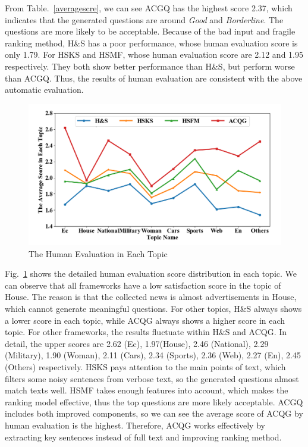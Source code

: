 \documentclass[runningheads,UTF8,article]{comsis2}
\newcommand\revised[1]{{\color{black} #1}}
\begin{document}
	\revised{From Table.~\ref{averagescre}, we can see ACGQ has the highest score 2.37, which indicates that the generated questions are around \emph{Good} and \emph{Borderline}. The questions are more likely to be acceptable. Because of the bad input and fragile ranking method, H\&S has a poor performance, whose human evaluation score is only 1.79. 
	For HSKS and HSMF, whose human evaluation score are 2.12 and 1.95 respectively. They both show better performance than H\&S, but perform worse than ACGQ. Thus, the results of human evaluation are consistent with the above automatic evaluation.}
	
	\begin{figure}[!ht]
		\centering
		\includegraphics[width=0.7\linewidth]{score}
		\caption{The Human Evaluation in Each Topic}
		\label{classcore}
	\end{figure}
	
	
	
	Fig.~\ref{classcore} shows the detailed human evaluation score distribution in each topic. We can observe that all frameworks have a low satisfaction score in the topic of House. The reason is that the collected news is almost advertisements in House, which cannot generate meaningful questions. For other topics, H\&S always shows a lower score in each topic, while ACQG always shows a higher score in each topic. For other frameworks, the results fluctuate within H\&S and ACQG. In detail, the upper scores are 2.62 (Ec), 1.97(House), 2.46 (National), 2.29 (Military), 1.90 (Woman), 2.11 (Cars), 2.34 (Sports), 2.36 (Web), 2.27 (En), 2.45 (Others) respectively. HSKS pays attention to the main points of text, which filters some noisy sentences from verbose text, so the generated questions almost match texts well. HSMF takes enough features into account, which makes the ranking model effective, thus the top questions are more likely acceptable. ACGQ includes both improved components, so we can see the average score of ACQG by human evaluation is the highest. Therefore, ACQG works effectively by extracting key sentences instead of full text and improving ranking method.
	
\end{document}
